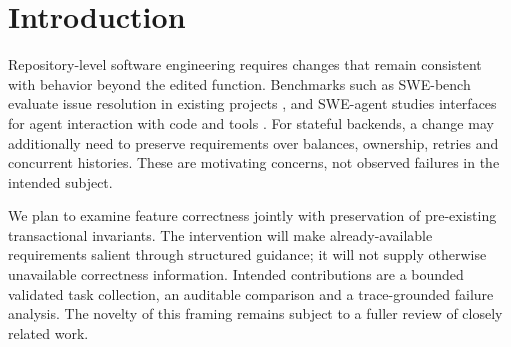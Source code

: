 \section{Introduction}
Repository-level software engineering requires changes that remain consistent with behavior beyond
the edited function. Benchmarks such as SWE-bench evaluate issue resolution in existing projects
\cite{swe-bench}, and SWE-agent studies interfaces for agent interaction with code and tools
\cite{swe-agent}. For stateful backends, a change may additionally need to preserve requirements
over balances, ownership, retries and concurrent histories. These are motivating concerns, not
observed failures in the intended subject.

We plan to examine feature correctness jointly with preservation of pre-existing transactional
invariants. The intervention will make already-available requirements salient through structured
guidance; it will not supply otherwise unavailable correctness information. Intended contributions
are a bounded validated task collection, an auditable comparison and a trace-grounded failure analysis.
The novelty of this framing remains subject to a fuller review of closely related work.
